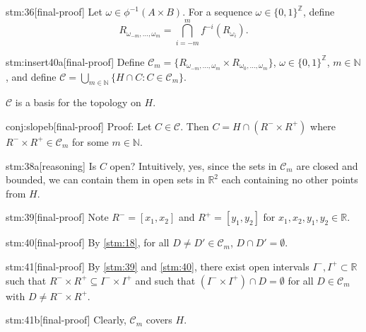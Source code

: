 \begin{stm}{stm:36}[final-proof]
Let $\omega \in \phi^{-1}(A \times B)$. For a sequence $\omega \in \{0,1\}^\mathbb{Z}$, define 
\[
R_{\omega_{-m}, \ldots, \omega_{m}} = \bigcap_{i = -m}^m f^{-i}(R_{\omega_i}).
\]
\end{stm}

\begin{stm}{stm:insert40a}[final-proof]
Define $\mathcal{C}_m = \{ R_{\omega_{-m},\ldots,\omega_m} \times R_{\omega_0,\ldots,\omega_m} \}$, $\omega \in \{0,1\}^\mathbb{Z}$, $m \in \mathbb{N}$, and define $\mathcal{C} = \bigcup_{m \in \mathbb{N}} \{ H \cap C : C \in \mathcal{C}_m \}$.
\end{stm}

\begin{conj}\label{conj:slope}
$\mathcal{C}$ is a basis for the topology on $H$.
\end{conj}

\begin{stm}{conj:slopeb}[final-proof]
Proof: Let $C \in \mathcal{C}$. Then $C = H \cap (R^- \times R^+)$ where $R^- \times R^+ \in \mathcal{C}_m$ for some $m \in \mathbb{N}$.
\end{stm}

\begin{stm}{stm:38a}[reasoning]
Is $C$ open? Intuitively, yes, since the sets in $\mathcal{C}_m$ are closed and bounded, we can contain them in open sets in $\mathbb{R}^2$ each containing no other points from $H$.
\end{stm}

\begin{stm}{stm:39}[final-proof]
Note $R^- = [x_1, x_2]$ and $R^+ = [y_1, y_2]$ for $x_1,x_2,y_1,y_2 \in \mathbb{R}$.
\end{stm}

\begin{stm}{stm:40}[final-proof]
By \ref{stm:18}, for all $D \ne D' \in \mathcal{C}_m$, $D \cap D' = \emptyset$.
\end{stm}

\begin{stm}{stm:41}[final-proof]
By \ref{stm:39} and \ref{stm:40}, there exist open intervals $I^-, I^+ \subset \mathbb{R}$ such that $R^- \times R^+ \subseteq I^- \times I^+$ and such that $(I^- \times I^+) \cap D = \emptyset$ for all $D \in \mathcal{C}_m$ with $D \ne R^- \times R^+$. 
\end{stm}

\begin{stm}{stm:41b}[final-proof]
Clearly, $\mathcal{C}_m$ covers $H$.
\end{stm}

